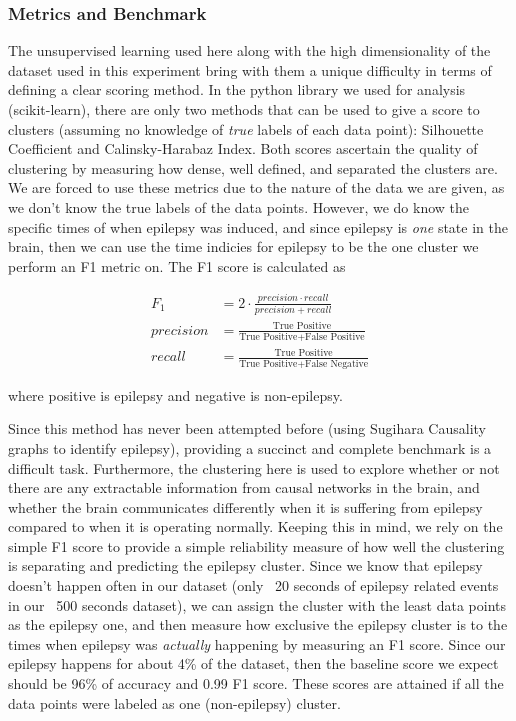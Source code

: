 \subsubsection{Metrics and Benchmark}
\label{sec:benchmark}
The unsupervised learning used here along with the high dimensionality of the dataset used in this experiment bring with them a unique difficulty in terms of defining a clear scoring method. In the python library we used for analysis (scikit-learn), there are only two methods that can be used to give a score to clusters (assuming no knowledge of \textit{true} labels of each data point): Silhouette Coefficient and Calinsky-Harabaz Index. Both scores ascertain the quality of clustering by measuring how dense, well defined, and separated the clusters are. We are forced to use these metrics due to the nature of the data we are given, as we don't know the true labels of the data points. However, we do know the specific times of when epilepsy was induced, and since epilepsy is \textit{one} state in the brain, then we can use the time indicies for epilepsy to be the one cluster we perform an F1 metric on. The F1 score is calculated as 

\begin{align*}
  F_1 &= 2 \cdot \frac{precision \cdot recall}{precision + recall} \\
  precision &= \frac{\text{True Positive}}{\text{True Positive} + \text{False Positive}} \\
  recall &= \frac{\text{True Positive}}{\text{True Positive} + \text{False Negative}}
\end{align*}

where positive is epilepsy and negative is non-epilepsy.

Since this method has never been attempted before (using Sugihara Causality graphs to identify epilepsy), providing a succinct and complete benchmark is a difficult task. Furthermore, the clustering here is used to explore whether or not there are any extractable information from causal networks in the brain, and whether the brain communicates differently when it is suffering from epilepsy compared to when it is operating normally. Keeping this in mind, we rely on the simple F1 score to provide a simple reliability measure of how well the clustering is separating and predicting the epilepsy cluster. Since we know that epilepsy doesn't happen often in our dataset (only ~20 seconds  of epilepsy related events in our ~500 seconds dataset), we can assign the cluster with the least data points as the epilepsy one, and then measure how exclusive the epilepsy cluster is to the times when epilepsy was \textit{actually} happening by measuring an F1 score. Since our epilepsy happens for about 4\% of the dataset, then the baseline score we expect should be 96\% of accuracy and 0.99 F1 score. These scores are attained if all the data points were labeled as one (non-epilepsy) cluster.

